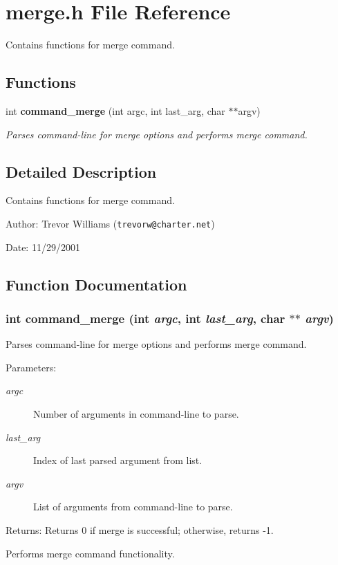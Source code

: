 \section{merge.h File Reference}
\label{merge_8h}
Contains functions for merge command.  


\subsection*{Functions}
\begin{CompactItemize}
\item 
int {\bf command\_\-merge} (int argc, int last\_\-arg, char $\ast$$\ast$argv)
\begin{CompactList}\small\item\em Parses command-line for merge options and performs merge command. \item\end{CompactList}\end{CompactItemize}


\subsection{Detailed Description}
Contains functions for merge command. 

\begin{Desc}
\item[Author:]Trevor Williams ({\tt trevorw@charter.net}) \end{Desc}
\begin{Desc}
\item[Date:]11/29/2001 \end{Desc}


\subsection{Function Documentation}
\subsubsection{\setlength{\rightskip}{0pt plus 5cm}int command\_\-merge (int {\em argc}, int {\em last\_\-arg}, char $\ast$$\ast$ {\em argv})}\label{merge_8h_a0}


Parses command-line for merge options and performs merge command. 

\begin{Desc}
\item[Parameters:]
\begin{description}
\item[{\em argc}]Number of arguments in command-line to parse. \item[{\em last\_\-arg}]Index of last parsed argument from list. \item[{\em argv}]List of arguments from command-line to parse.\end{description}
\end{Desc}
\begin{Desc}
\item[Returns:]Returns 0 if merge is successful; otherwise, returns -1.\end{Desc}
Performs merge command functionality. 